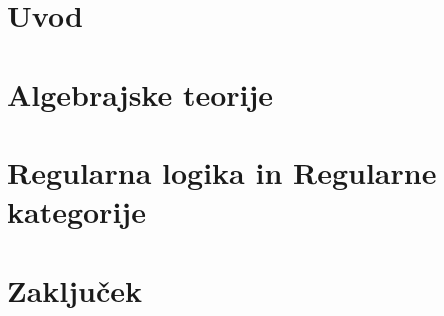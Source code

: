 \documentclass[12pt,a4paper]{book}
\begin{document}
%
\frontmatter%

%
\mainmatter%
\setcounter{page}{1}
\pagestyle{fancy}
%
\chapter{Uvod}

%
\chapter{Algebrajske teorije}

%
\chapter{Regularna logika in Regularne kategorije}

%
\chapter{Zaključek}

%



\end{document}
